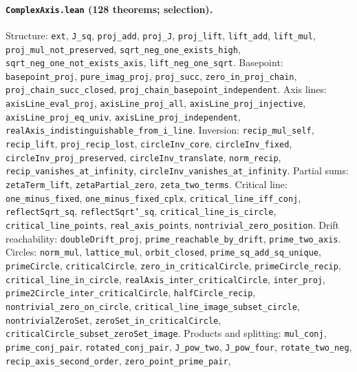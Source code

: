 \documentclass[sigplan,10pt,anonymous,review]{acmart}
\begin{document}
\paragraph{\texttt{ComplexAxis.lean} (128 theorems; selection).}
Structure: \texttt{ext}, \texttt{J\_sq}, \texttt{proj\_add},
\texttt{proj\_J}, \texttt{proj\_lift}, \texttt{lift\_add},
\texttt{lift\_mul}, \texttt{proj\_mul\_not\_preserved},
\texttt{sqrt\_neg\_one\_exists\_high},
\texttt{sqrt\_neg\_one\_not\_exists\_axis},
\texttt{lift\_neg\_one\_sqrt}. Basepoint: \texttt{basepoint\_proj},
\texttt{pure\_imag\_proj}, \texttt{proj\_succ},
\texttt{zero\_in\_proj\_chain}, \texttt{proj\_chain\_succ\_closed},
\texttt{proj\_chain\_basepoint\_independent}. Axis lines:
\texttt{axisLine\_eval\_proj}, \texttt{axisLine\_proj\_all},
\texttt{axisLine\_proj\_injective}, \texttt{axisLine\_proj\_eq\_univ},
\texttt{axisLine\_proj\_independent},
\texttt{realAxis\_indistinguishable\_from\_i\_line}. Inversion:
\texttt{recip\_mul\_self}, \texttt{recip\_lift},
\texttt{proj\_recip\_lost}, \texttt{circleInv\_core},
\texttt{circleInv\_fixed}, \texttt{circleInv\_proj\_preserved},
\texttt{circleInv\_translate}, \texttt{norm\_recip},
\texttt{recip\_vanishes\_at\_infinity}, \texttt{circleInv\_vanishes\_at\_infinity}.
Partial sums: \texttt{zetaTerm\_lift}, \texttt{zetaPartial\_zero},
\texttt{zeta\_two\_terms}. Critical line:
\texttt{one\_minus\_fixed}, \texttt{one\_minus\_fixed\_cplx},
\texttt{critical\_line\_iff\_conj}, \texttt{reflectSqrt\_sq},
\texttt{reflectSqrt'\_sq}, \texttt{critical\_line\_is\_circle},
\texttt{critical\_line\_points}, \texttt{real\_axis\_points},
\texttt{nontrivial\_zero\_position}. Drift reachability:
\texttt{doubleDrift\_proj}, \texttt{prime\_reachable\_by\_drift},
\texttt{prime\_two\_axis}. Circles: \texttt{norm\_mul},
\texttt{lattice\_mul}, \texttt{orbit\_closed},
\texttt{prime\_sq\_add\_sq\_unique}, \texttt{primeCircle},
\texttt{criticalCircle}, \texttt{zero\_in\_criticalCircle},
\texttt{primeCircle\_recip}, \texttt{critical\_line\_in\_circle},
\texttt{realAxis\_inter\_criticalCircle}, \texttt{inter\_proj},
\texttt{prime2Circle\_inter\_criticalCircle}, \texttt{halfCircle\_recip},
\texttt{nontrivial\_zero\_on\_circle},
\texttt{critical\_line\_image\_subset\_circle},
\texttt{nontrivialZeroSet}, \texttt{zeroSet\_in\_criticalCircle},
\texttt{criticalCircle\_subset\_zeroSet\_image}. Products and splitting:
\texttt{mul\_conj}, \texttt{prime\_conj\_pair},
\texttt{rotated\_conj\_pair}, \texttt{J\_pow\_two},
\texttt{J\_pow\_four}, \texttt{rotate\_two\_neg},
\texttt{recip\_axis\_second\_order}, \texttt{zero\_point\_prime\_pair},
\end{document}

